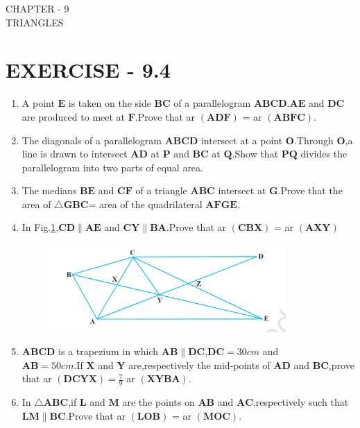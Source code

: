 \documentclass[12pt]{article}
\let\vec\mathbf
\begin{document}
\begin{center}
\textbf\large{CHAPTER - 9  \\  TRIANGLES}
\section*{EXERCISE - 9.4}
\end{center}

\begin{enumerate}

\item A point $\vec{E} $ is taken on the side $\vec{BC} $ of a parallelogram $\vec{ABCD} $.$\vec{AE}$ and  $\vec{DC}$ are produced to meet at $\vec{F}$.Prove that  ar $\vec{(ADF)}$ = ar $\vec{(ABFC)}$.
\item The diagonals of a parallelogram $\vec{ABCD}$ intersect at a point $\vec{O}$.Through $\vec{O}$,a line is drawn to intersect $\vec{AD}$ at $\vec{P}$ and $\vec{BC}$ at $\vec{Q}$.Show that $\vec{PQ}$ divides the parallelogram into two parts of equal area.
\item The medians $\vec{BE}$ and $\vec{CF}$ of a triangle $\vec{ABC}$ intersect at $\vec{G}$.Prove that the area of $ \triangle\vec{GBC} $= area of the quadrilateral $\vec{AFGE}$.	
\item In Fig.\ref{fig:9.24},$\vec{CD} \parallel \vec{AE} $ and $ \vec{CY} \parallel \vec{BA} $.Prove that ar $\vec{(CBX)}$ = ar $\vec{(AXY)}$
\begin{figure}[h]
	\centering
	\includegraphics[width=9cm]{Figs/Fig9.24.png}
	\caption{}
	\label{fig:9.24}
\end{figure}
\item $\vec{ABCD}$ is a trapezium in which $\vec{AB} \parallel \vec{DC} $,$\vec{DC} = 30 cm $  and \\ $\vec{AB} = 50 cm $.If $\vec{X}$ and $\vec{Y}$ are,respectively the mid-points of $\vec{AD}$ and $\vec{BC}$,prove that  ar $\vec{(DCYX)} = \frac{7}{9}$ ar $\vec{(XYBA)} $.
\item  In $ \triangle\vec{ABC} $,if $\vec{L}$ and $\vec{M}$ are the points on $\vec{AB}$ and $\vec{AC}$,respectively such that $ \vec{LM} \parallel \vec{BC} $.Prove that ar $\vec{(LOB)}$ = ar $\vec{(MOC)}$.

\end{enumerate}
\end{document}
